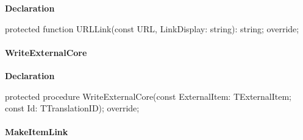 \documentclass{report}
\newif\ifpdf
\begin{document}
\label{PasDoc_GenHtml.TGenericHTMLDocGenerator-URLLink}
\begin{list}{}{
\setlength{\itemindent}{0cm}
\setlength{\listparindent}{0cm}
\setlength{\leftmargin}{\evensidemargin}
\addtolength{\leftmargin}{\tmplength}
\settowidth{\labelsep}{X}
\addtolength{\leftmargin}{\labelsep}
\setlength{\labelwidth}{\tmplength}
}
\item[\textbf{Declaration}\hfill]
\ifpdf
\begin{flushleft}
\fi
\begin{ttfamily}
protected function URLLink(const URL, LinkDisplay: string): string; override;\end{ttfamily}

\ifpdf
\end{flushleft}
\fi

\end{list}
\paragraph*{WriteExternalCore}\hspace*{\fill}

\label{PasDoc_GenHtml.TGenericHTMLDocGenerator-WriteExternalCore}
\begin{list}{}{
\setlength{\itemindent}{0cm}
\setlength{\listparindent}{0cm}
\setlength{\leftmargin}{\evensidemargin}
\addtolength{\leftmargin}{\tmplength}
\settowidth{\labelsep}{X}
\addtolength{\leftmargin}{\labelsep}
\setlength{\labelwidth}{\tmplength}
}
\item[\textbf{Declaration}\hfill]
\ifpdf
\begin{flushleft}
\fi
\begin{ttfamily}
protected procedure WriteExternalCore(const ExternalItem: TExternalItem; const Id: TTranslationID); override;\end{ttfamily}

\ifpdf
\end{flushleft}
\fi

\end{list}
\paragraph*{MakeItemLink}\hspace*{\fill}
\end{document}
